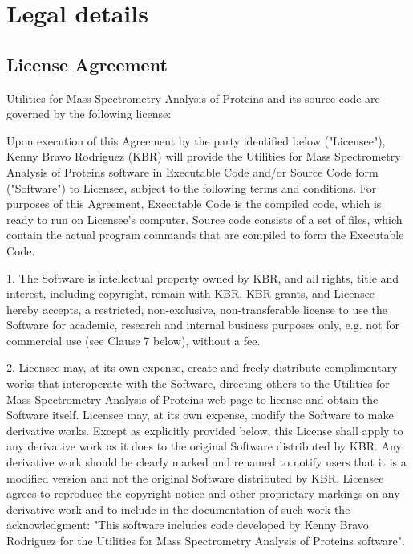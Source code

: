 \chapter{Legal details}
\label{chap:licagre}

\section{License Agreement}

Utilities for Mass Spectrometry Analysis of Proteins and its source code are governed
by the following license:

Upon execution of this Agreement by the party identified below ("Licensee"), Kenny
Bravo Rodriguez (KBR) will provide the Utilities for Mass Spectrometry Analysis of
Proteins software in Executable Code and/or Source Code form ("Software") to Licensee,
subject to the following terms and conditions. For purposes of this Agreement, Executable
Code is the compiled code, which is ready to run on Licensee's computer. Source code
consists of a set of files, which contain the actual program commands that are compiled
to form the Executable Code.

\num{1}. The Software is intellectual property owned by KBR, and all rights, title and
interest, including copyright, remain with KBR. KBR grants, and Licensee hereby
accepts, a restricted, non-exclusive, non-transferable license to use the Software
for academic, research and internal business purposes only, e.g. not for commercial
use (see Clause 7 below), without a fee.

\num{2}. Licensee may, at its own expense, create and freely distribute complimentary works
that interoperate with the Software, directing others to the Utilities for Mass
Spectrometry Analysis of Proteins web page to license and obtain the Software itself.
Licensee may, at its own expense, modify the Software to make derivative works. Except
as explicitly provided below, this License shall apply to any derivative work as
it does to the original Software distributed by KBR. Any derivative work should be
clearly marked and renamed to notify users that it is a modified version and not
the original Software distributed by KBR. Licensee agrees to reproduce the copyright
notice and other proprietary markings on any derivative work and to include in the
documentation of such work the acknowledgment: "This software includes code developed
by Kenny Bravo Rodriguez for the Utilities for Mass Spectrometry Analysis of Proteins
software".

